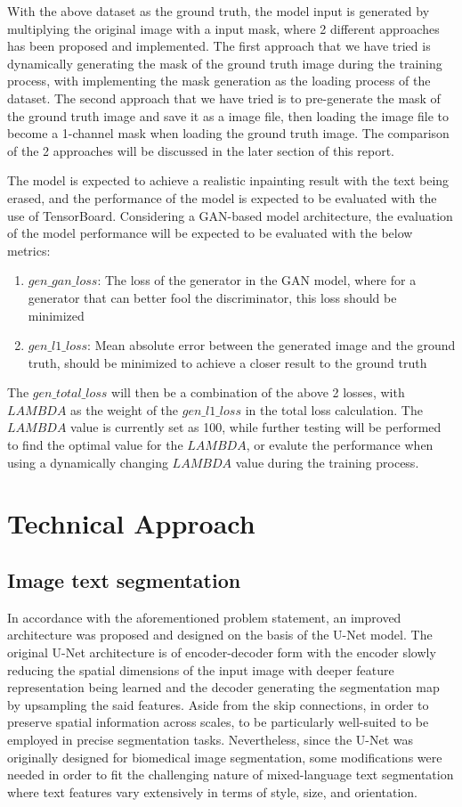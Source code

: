 \documentclass[10pt,twocolumn,letterpaper]{article}
\begin{document}
With the above dataset as the ground truth, the model input is generated by multiplying the original image with a input mask, where 2 different approaches has been 
proposed and implemented. The first approach that we have tried is dynamically generating the mask of the ground truth image during the training process, with implementing
the mask generation as the loading process of the dataset. The second approach that we have tried is to pre-generate the mask of the ground truth image and save it as a image
file, then loading the image file to become a 1-channel mask when loading the ground truth image. The comparison of the 2 approaches will be discussed in the later 
section of this report.

The model is expected to achieve a realistic inpainting result with the text being erased, and the performance of the model is expected to be evaluated with the
use of TensorBoard. Considering a GAN-based model architecture, the evaluation of the model performance will be expected to be evaluated with the below metrics:
\begin{enumerate}
    \item $gen\_gan\_loss$: The loss of the generator in the GAN model, where for a generator that can better fool the discriminator, this loss should be minimized
    \item $gen\_l1\_loss$: Mean absolute error between the generated image and the ground truth, should be minimized to achieve a closer result to the ground truth
\end{enumerate}

The $gen\_total\_loss$ will then be a combination of the above 2 losses, with $LAMBDA$ as the weight of the $gen\_l1\_loss$ in the total loss calculation. The $LAMBDA$
value is currently set as 100, while further testing will be performed to find the optimal value for the $LAMBDA$, or evalute the performance when using a dynamically
changing $LAMBDA$ value during the training process.

\section{Technical Approach}

\subsection{Image text segmentation}
In accordance with the aforementioned problem statement, an improved architecture was proposed and designed on the basis of the U-Net model. 
The original U-Net architecture is of encoder-decoder form with the encoder slowly reducing the spatial dimensions of the input image with 
deeper feature representation being learned and the decoder generating the segmentation map by upsampling the said features. 
Aside from the skip connections, in order to preserve spatial information across scales, to be particularly well-suited to be employed 
in precise segmentation tasks. Nevertheless, since the U-Net was originally designed for biomedical image segmentation, 
some modifications were needed in order to fit the challenging nature of mixed-language text segmentation where text features 
vary extensively in terms of style, size, and orientation.
\end{document}
